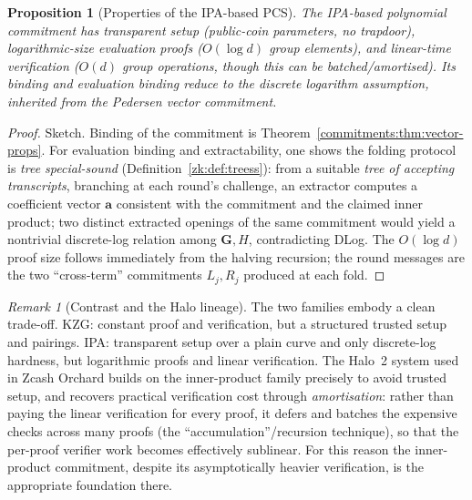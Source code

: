 \documentclass[11pt,a4paper]{article}
\newtheorem{proposition}[theorem]{Proposition}
\theoremstyle{definition}
\theoremstyle{remark}
\newtheorem{remark}[theorem]{Remark}
\begin{document}
\begin{proposition}[Properties of the IPA-based PCS]\label{commitments:prop:ipa-props}
The IPA-based polynomial commitment has \emph{transparent setup} (public-coin parameters, no trapdoor), \emph{logarithmic-size} evaluation proofs (\(O(\log d)\) group elements), and \emph{linear-time} verification (\(O(d)\) group operations, though this can be batched/amortised). Its binding and evaluation binding reduce to the discrete logarithm assumption, inherited from the Pedersen vector commitment.
\end{proposition}

\begin{proof}
Sketch. Binding of the commitment is Theorem~\ref{commitments:thm:vector-props}. For evaluation binding and extractability, one shows the folding protocol is \emph{tree special-sound} (Definition~\ref{zk:def:treess}): from a suitable \emph{tree of accepting transcripts}, branching at each round's challenge, an extractor computes a coefficient vector \(\mathbf{a}\) consistent with the commitment and the claimed inner product; two distinct extracted openings of the same commitment would yield a nontrivial discrete-log relation among \(\mathbf{G}, H\), contradicting DLog. The \(O(\log d)\) proof size follows immediately from the halving recursion; the round messages are the two ``cross-term'' commitments \(L_j, R_j\) produced at each fold.
\end{proof}

\begin{remark}[Contrast and the Halo lineage]\label{commitments:rem:pcs-contrast}
The two families embody a clean trade-off. KZG: constant proof and verification, but a structured trusted setup and pairings. IPA: transparent setup over a plain curve and only discrete-log hardness, but logarithmic proofs and linear verification. The Halo~2 system used in Zcash Orchard builds on the inner-product family precisely to avoid trusted setup, and recovers practical verification cost through \emph{amortisation}: rather than paying the linear verification for every proof, it defers and batches the expensive checks across many proofs (the ``accumulation''/recursion technique), so that the per-proof verifier work becomes effectively sublinear. For this reason the inner-product commitment, despite its asymptotically heavier verification, is the appropriate foundation there.
\end{remark}
\end{document}
